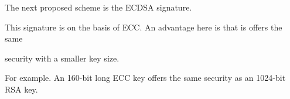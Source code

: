 \tiny

The next proposed scheme is the ECDSA signature.

This signature is on the basis of ECC. An advantage here is that is offers the same

security with a smaller key size.

\bigskip

For example. An 160-bit long ECC key offers the same security as an 1024-bit RSA key.